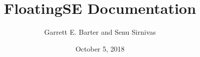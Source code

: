 \documentclass{book}
\title{FloatingSE Documentation}
\author{Garrett E. Barter and Senu Sirnivas}
\date{October 5, 2018}
\begin{document}
%
% 

\maketitle
\tableofcontents
\listoffigures
\listoftables

\newpage









\cleardoublepage
\begin{singlespace} \begin{small} \pagestyle{plain}
    
    
\end{small} \end{singlespace}
\end{document}
